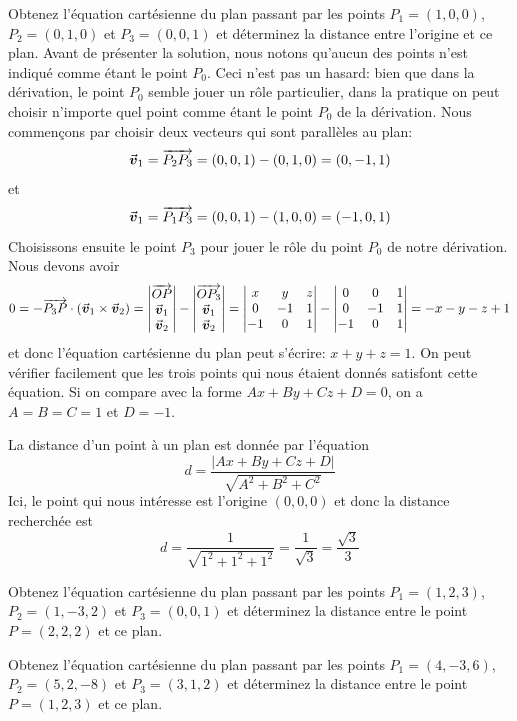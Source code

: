 \begin{exemple}
Obtenez l'équation cartésienne du plan passant par les points $P_1=(1,0,0)$, $P_2=(0,1,0)$ et $P_3=(0,0,1)$ et
déterminez la distance entre l'origine et ce plan.
\solution
Avant de présenter la solution, nous notons qu'aucun des points n'est indiqué comme étant le point $P_0$. Ceci n'est
pas un hasard: bien que dans la dérivation, le point $P_0$ semble jouer un rôle particulier, dans la pratique on
peut choisir n'importe quel point comme étant le point $P_0$ de la dérivation.  Nous commençons par choisir
deux vecteurs qui sont parallèles au plan:
\[
\vec{\boldsymbol{v}}_1 = \overrightarrow{P_2P_3} = (0,0,1) - (0,1,0) = (0,-1,1)
\]
et 
\[
\vec{\boldsymbol{v}}_1 = \overrightarrow{P_1P_3} = (0,0,1) - (1,0,0) = (-1,0,1)
\]
Choisissons ensuite le point $P_3$ pour jouer le rôle du point $P_0$ de notre dérivation.  Nous devons avoir
\[
0 = -\overrightarrow{P_3P} \cdot (\vec{\boldsymbol{v}}_1 \times \vec{\boldsymbol{v}}_2) = \begin{vmatrix}
\overrightarrow{OP}\\
\vec{\boldsymbol{v}}_1 \\
\vec{\boldsymbol{v}}_2
\end{vmatrix} 
-
\begin{vmatrix}
\overrightarrow{OP_3}\\
\vec{\boldsymbol{v}}_1 \\
\vec{\boldsymbol{v}}_2
\end{vmatrix} =\begin{vmatrix}
x & y & z \\
0 & -1 & 1 \\
-1 & 0 & 1
\end{vmatrix}
-
\begin{vmatrix}
0 & 0 & 1 \\
0 & -1 & 1 \\
-1 & 0 & 1
\end{vmatrix} = -x-y-z+1
\]
et donc l'équation cartésienne du plan peut s'écrire: $x+y+z=1$.  On peut
vérifier facilement que les trois points qui nous étaient donnés satisfont cette équation.
Si on compare avec la forme $Ax+By+Cz+D=0$, on a $A=B=C=1$ et $D=-1$.

La distance d'un point à un plan est donnée par l'équation 
\[
d = \frac{|Ax + By + Cz + D|}{\sqrt{A^2 + B^2 + C^2}} 
\]
Ici, le point qui nous intéresse est l'origine $(0,0,0)$ et donc la distance recherchée est
\[
d = \frac{1}{\sqrt{1^2 + 1^2 + 1^2}} = \frac{1}{\sqrt{3}} = \frac{\sqrt{3}}{3}
\]
\end{exemple}

\begin{exerciceC}
Obtenez l'équation cartésienne du plan passant par les points $P_1=(1,2,3)$, $P_2=(1,-3,2)$ et $P_3=(0,0,1)$ et
déterminez la distance entre le point $P=(2,2,2)$ et ce plan.
\end{exerciceC}
\begin{exerciceC}
Obtenez l'équation cartésienne du plan passant par les points $P_1=(4,-3,6)$, $P_2=(5,2,-8)$ et $P_3=(3,1,2)$ et
déterminez la distance entre le point $P=(1,2,3)$ et ce plan.
\end{exerciceC}